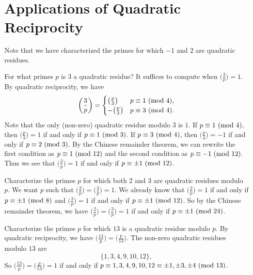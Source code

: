 \section{Applications of Quadratic Reciprocity}

\begin{remark}
  Note that we have characterized the
  primes for which $-1$ and $2$ are
  quadratic residues.
\end{remark}

\pagebreak
\begin{example}
  For what primes $p$ is
  $3$ a quadratic residue?
  It suffices to compute when $\big(\frac{3}{p}\big) = 1$.
  By quadratic reciprocity, we have
  \[
    \left(\frac{3}{p}\right)
    =
    \begin{cases}
      \big(\frac{p}{3}\big) & p \equiv 1 \ (\mathrm{mod}\ 4),\\
      -\big(\frac{p}{3}\big) & p \equiv 3 \ (\mathrm{mod}\ 4).
    \end{cases}
  \]
  Note that the only (non-zero) quadratic
  residue modulo $3$ is $1$.
  If $p \equiv 1 \ (\mathrm{mod}\ 4)$, then
  $\big(\frac{p}{3}\big) = 1$
  if and only if $p \equiv 1 \ (\mathrm{mod}\ 3)$.
  If $p \equiv 3 \ (\mathrm{mod}\ 4)$,
  then $\big(\frac{p}{3}\big) = -1$
  if and only if $p \equiv 2 \ (\mathrm{mod}\ 3)$.
  By the Chinese remainder theorem,
  we can rewrite the first condition
  as $p \equiv 1 \ (\mathrm{mod}\ 12)$ and the
  second condition as
  $p \equiv -1 \ (\mathrm{mod}\ 12)$. Thus
  we see that $\big(\frac{3}{p}\big) = 1$
  if and only if
  $p \equiv \pm 1 \ (\mathrm{mod}\ 12)$.
\end{example}

\begin{example}
  Characterize the primes $p$ for
  which both $2$ and $3$ are
  quadratic residues modulo $p$.
  We want $p$ such that
  $\big(\frac{2}{p}\big) = \big(\frac{3}{p}\big) = 1$.
  We already know that
  $\big(\frac{2}{p}\big) = 1$
  if and only if $p \equiv \pm 1 \ (\mathrm{mod}\ 8)$
  and $\big(\frac{3}{p}\big) = 1$
  if and only if $p \equiv \pm 1 \ (\mathrm{mod}\ 12)$.
  So by the Chinese remainder theorem,
  we have
  $\big(\frac{2}{p}\big) = \big(\frac{3}{p}\big) = 1$
  if and only if
  $p \equiv \pm 1 \ (\mathrm{mod}\ 24)$.
\end{example}

\begin{example}
  Characterize the primes $p$ for which
  $13$ is a quadratic residue modulo $p$.
  By quadratic reciprocity,
  we have
  $\big(\frac{13}{p}\big) = \big(\frac{p}{13}\big)$.
  The non-zero
  quadratic residues modulo $13$ are
  \[
    \{1, 3, 4, 9, 10, 12\},
  \]
  So $\big(\frac{13}{p}\big) = \big(\frac{p}{13}\big) = 1$
  if and only if
  $p \equiv 1, 3, 4, 9, 10, 12 \equiv \pm 1, \pm 3, \pm 4 \ (\mathrm{mod}\ 13)$.
\end{example}

